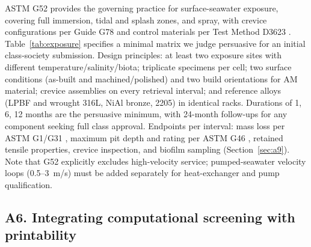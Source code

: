 ASTM G52 provides the governing practice for surface-seawater exposure, covering full immersion, tidal and splash zones, and spray, with crevice configurations per Guide G78 and control materials per Test Method D3623 \cite{astm_g52,astm_g78}. Table~\ref{tab:exposure} specifies a minimal matrix we judge persuasive for an initial class-society submission. Design principles: at least two exposure sites with different temperature/salinity/biota; triplicate specimens per cell; two surface conditions (as-built and machined/polished) and two build orientations for AM material; crevice assemblies on every retrieval interval; and reference alloys (LPBF and wrought 316L, NiAl bronze, 2205) in identical racks. Durations of 1, 6, 12 months are the persuasive minimum, with 24-month follow-ups for any component seeking full class approval. Endpoints per interval: mass loss per ASTM G1/G31 \cite{astm_g1,astm_g31}, maximum pit depth and rating per ASTM G46 \cite{astm_g46}, retained tensile properties, crevice inspection, and biofilm sampling (Section~\ref{sec:a9}). Note that G52 explicitly excludes high-velocity service; pumped-seawater velocity loops (0.5--3~m/s) must be added separately for heat-exchanger and pump qualification.

\subsection{A6. Integrating computational screening with printability}
\label{sec:a6}

